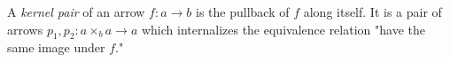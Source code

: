 A \emph{kernel pair} of an arrow $f: a \to b$ is the pullback of $f$ along itself. It is a pair of arrows $p_1, p_2: a \times_b a \to a$ which internalizes the equivalence relation "have the same image under $f$."
